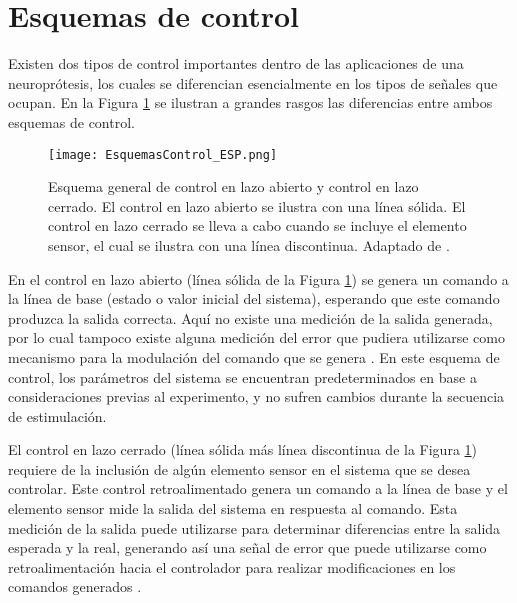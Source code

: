 \section{Esquemas de control}
Existen dos tipos de control importantes dentro de las aplicaciones de una neuroprótesis, los cuales se diferencian esencialmente en los tipos de señales que ocupan. En la Figura \ref{Figura: EsqCont} se ilustran a grandes rasgos las diferencias entre ambos esquemas de control.

\begin{figure}[htbp]
\centering
	\texttt{[image: EsquemasControl\_ESP.png]}
	\caption[Esquema general de control en lazo abierto y control en lazo cerrado]{Esquema general de control en lazo abierto y control en lazo cerrado. El control en lazo abierto se ilustra con una línea sólida. El control en lazo cerrado se lleva a cabo cuando se incluye el elemento sensor, el cual se ilustra con una línea discontinua. Adaptado de \cite{Wright2016}.}
	\label{Figura: EsqCont}
\end{figure}

En el control en lazo abierto (línea sólida de la Figura \ref{Figura: EsqCont}) se genera un comando a la línea de base (estado o valor inicial del sistema), esperando que este comando produzca la salida correcta. Aquí no existe una medición de la salida generada, por lo cual tampoco existe alguna medición del error que pudiera utilizarse como mecanismo para la modulación del comando que se genera \cite{Wright2016}. En este esquema de control, los parámetros del sistema se encuentran predeterminados en base a consideraciones previas al experimento, y no sufren cambios durante la secuencia de estimulación.

El control en lazo cerrado (línea sólida más línea discontinua de la Figura \ref{Figura: EsqCont}) requiere de la inclusión de algún elemento sensor en el sistema que se desea controlar. Este control retroalimentado genera un comando a la línea de base y el elemento sensor mide la salida del sistema en respuesta al comando. Esta medición de la salida puede utilizarse para determinar diferencias entre la salida esperada y la real, generando así una señal de error que puede utilizarse como retroalimentación hacia el controlador para realizar modificaciones en los comandos generados \cite{Wright2016}.

